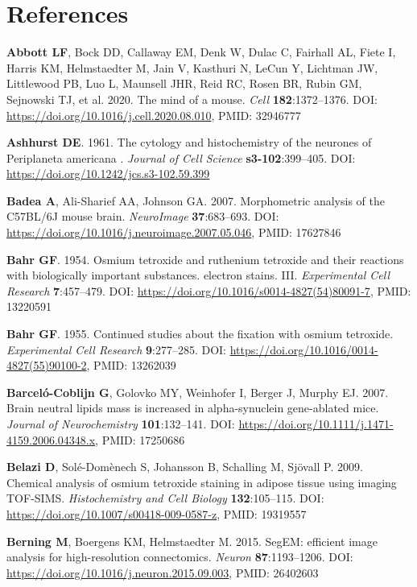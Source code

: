 \documentclass{article}
\newenvironment{reflist}{\par\small\setlength{\parindent}{0pt}\everypar{\hangindent=2.2em\hangafter=1}}{\par}
\begin{document}
\section*{References}
\begin{reflist}
\textbf{Abbott LF}, Bock DD, Callaway EM, Denk W, Dulac C, Fairhall AL, Fiete I, Harris KM, Helmstaedter M, Jain V, Kasthuri N, LeCun Y, Lichtman JW, Littlewood PB, Luo L, Maunsell JHR, Reid RC, Rosen BR, Rubin GM, Sejnowski TJ, et al. 2020. The mind of a mouse. \emph{Cell} \textbf{182}:1372–1376. DOI: \url{https://doi.org/10.1016/j.cell.2020.08.010}, PMID: 32946777

\textbf{Ashhurst DE}. 1961. The cytology and histochemistry of the neurones of Periplaneta americana . \emph{Journal of Cell Science} \textbf{s3-102}:399–405. DOI: \url{https://doi.org/10.1242/jcs.s3-102.59.399}

\textbf{Badea A}, Ali-Sharief AA, Johnson GA. 2007. Morphometric analysis of the C57BL/6J mouse brain. \emph{NeuroImage} \textbf{37}:683–693. DOI: \url{https://doi.org/10.1016/j.neuroimage.2007.05.046}, PMID: 17627846

\textbf{Bahr GF}. 1954. Osmium tetroxide and ruthenium tetroxide and their reactions with biologically important substances. electron stains. III. \emph{Experimental Cell Research} \textbf{7}:457–479. DOI: \url{https://doi.org/10.1016/s0014-4827(54)80091-7}, PMID: 13220591

\textbf{Bahr GF}. 1955. Continued studies about the fixation with osmium tetroxide. \emph{Experimental Cell Research} \textbf{9}:277–285. DOI: \url{https://doi.org/10.1016/0014-4827(55)90100-2}, PMID: 13262039

\textbf{Barceló-Coblijn G}, Golovko MY, Weinhofer I, Berger J, Murphy EJ. 2007. Brain neutral lipids mass is increased in alpha-synuclein gene-ablated mice. \emph{Journal of Neurochemistry} \textbf{101}:132–141. DOI: \url{https://doi.org/10.1111/j.1471-4159.2006.04348.x}, PMID: 17250686

\textbf{Belazi D}, Solé-Domènech S, Johansson B, Schalling M, Sjövall P. 2009. Chemical analysis of osmium tetroxide staining in adipose tissue using imaging TOF-SIMS. \emph{Histochemistry and Cell Biology} \textbf{132}:105–115. DOI: \url{https://doi.org/10.1007/s00418-009-0587-z}, PMID: 19319557

\textbf{Berning M}, Boergens KM, Helmstaedter M. 2015. SegEM: efficient image analysis for high-resolution connectomics. \emph{Neuron} \textbf{87}:1193–1206. DOI: \url{https://doi.org/10.1016/j.neuron.2015.09.003}, PMID: 26402603


\end{reflist}
\end{document}
